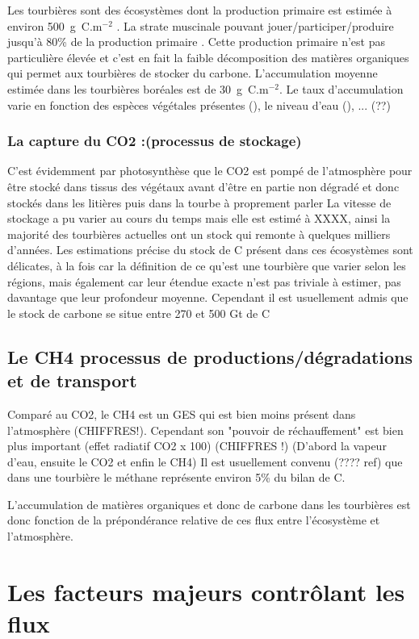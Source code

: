 Les tourbières sont des écosystèmes dont la production primaire est estimée à environ 500~g~C.m$^{-2}$ \cite{francez2000}. 
La strate muscinale pouvant jouer/participer/produire jusqu'à 80\% de la production primaire \cite{francez2000}.
Cette production primaire n'est pas particulière élevée \plop et c'est en fait la faible décomposition des matières organiques qui permet aux tourbières de stocker du carbone.
L'accumulation moyenne estimée dans les tourbières boréales est de 30~g~C.m$^{-2}$. Le taux d'accumulation varie en fonction des espèces végétales présentes (\plop), le niveau d'eau (\plop), ... (??)

\subsubsection{La capture du CO2 :(processus de stockage)}
C'est évidemment par photosynthèse que le CO2 est pompé de l'atmosphère pour être stocké dans tissus des végétaux avant d'être en partie non dégradé et donc stockés dans les litières puis dans la tourbe à proprement parler
La vitesse de stockage a pu varier au cours du temps mais elle est estimé à XXXX, ainsi la majorité des tourbières actuelles ont un stock qui remonte à quelques milliers d'années.
Les estimations précise du stock de C présent dans ces écosystèmes sont délicates, à la fois car la définition de ce qu'est une tourbière que varier selon les régions, mais également car leur étendue exacte n'est pas triviale à estimer, pas davantage que leur profondeur moyenne.
Cependant il est usuellement admis que le stock de carbone se situe entre 270 et 500 Gt de C

\subsection{Le CH4 processus de productions/dégradations et de transport}
Comparé au CO2, le CH4 est un GES qui est bien moins présent dans l'atmosphère (CHIFFRES!).
Cependant son "pouvoir de réchauffement" est bien plus important (effet radiatif CO2 x 100) (CHIFFRES !) (D'abord la vapeur d'eau, ensuite le CO2 et enfin le CH4)
Il est usuellement convenu (???? ref) que dans une tourbière le méthane représente environ 5\% du bilan de C.


L'accumulation de matières organiques et donc de carbone dans les tourbières est donc fonction de la prépondérance relative de ces flux entre l'écosystème et l'atmosphère.

\section{Les facteurs majeurs contrôlant les flux}

